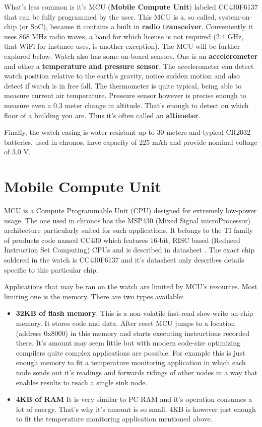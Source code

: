 What's less common is it's MCU ({\bf Mobile Compute Unit}) labeled
CC430F6137 that can be fully programmed by the user. This MCU is a, so
called, system-on-chip (or SoC), because it contains a built in {\bf
radio transceiver}. Conveniently it uses 868 MHz radio waves, a band
for which license is not required (2.4 GHz, that WiFi for instance
uses, is another exception). The MCU will be further explored below.
Watch also has some on-board sensors.  One is an {\bf accelerometer}
and other a {\bf temperature and pressure sensor}. The accelerometer
can detect watch position relative to the earth's gravity, notice
sudden motion and also detect if watch is in free fall. The
thermometer is quite typical, being able to measure current air
temperature. Pressure sensor however is precise enough to measure even
a 0.3 meter change in altitude. That's enough to detect on which floor
of a building you are. Thus it's often called an {\bf altimeter}.

Finally, the watch casing is water resistant up to 30 meters and typical
CR2032 batteries, used in chronos, have capacity of 225 mAh and
provide nominal voltage of 3.0 V.

\section{Mobile Compute Unit}

MCU is a Compute Programmable Unit (CPU) designed for extremely
low-power usage. The one used in chronos has the MSP430 (Mixed Signal
microProcessor) architecture particularly suited for such
applications. It belongs to the TI family of products code named CC430
which features 16-bit, RISC based (Reduced Instruction Set Computing)
CPUs and is described in datasheet \cite{CC430ds}. The exact chip
soldered in the watch is CC430F6137 and it's datasheet
\cite{CC430F6137ds} only describes details specific to this particular
chip.

Applications that may be ran on the watch are limited by MCU's
resources. Most limiting one is the memory. There are two types
available:
\begin{itemize}
  \item {\bf 32KB of flash memory}. This is a non-volatile fast-read
    slow-write on-chip memory. It stores code and data. After reset
    MCU jumps to a location (address 0x8000) in this memory and starts
    executing instructions recorded there. It's amount may seem little
    but with
    modern code-size optimizing compilers quite complex applications
    are possible. For example this is just enough memory to fit a
    temperature monitoring application in which each node sends out
    it's readings and forwards ridings of other nodes in a way that
    enables results to reach a single sink node.
  \item {\bf 4KB of RAM} It is very similar to PC RAM and it's
    operation consumes a lot of energy. That's why it's amount is so
    small. 4KB is however just enough to fit the temperature monitoring
    application mentioned above.
\end{itemize}

